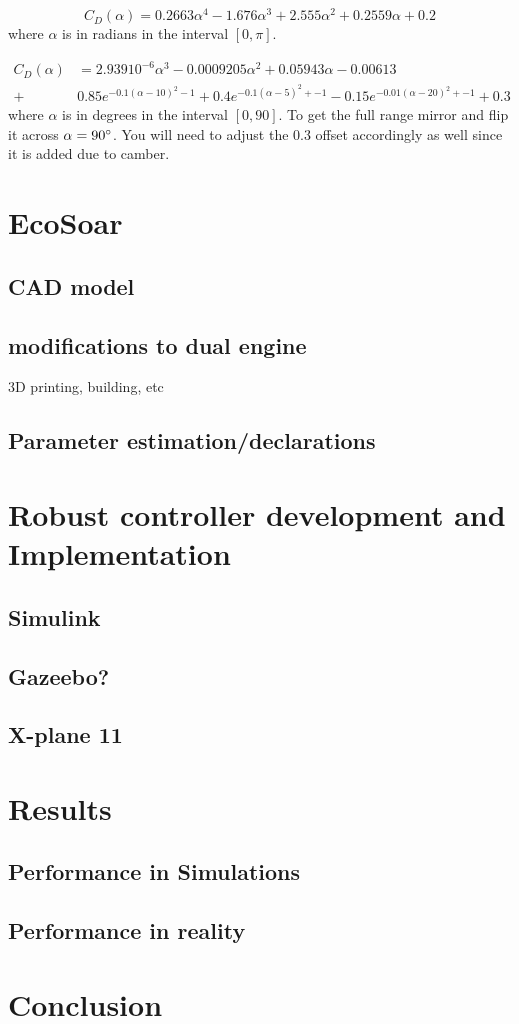 \documentclass{article}
\begin{document}
\begin{equation}
C_D(\alpha) = 0.2663 \alpha^4 -1.676 \alpha^3 + 2.555 \alpha^2 + 0.2559 \alpha + 0.2%
\end{equation}
where $\alpha$ is in radians in the interval $[0,\pi]$.

\begin{equation}\begin{split}
    C_D(\alpha) &= 2.939 10^{-6} \alpha^3 -0.0009205 \alpha^2 + 0.05943 \alpha -0.00613 \\
    +&
    0.85 e^{ -0.1 (\alpha - 10)^2 - 1 } + 0.4 e^{ -0.1 (\alpha - 5)^2 + -1 } - 0.15 e^{ -0.01 (\alpha - 20)^2 + -1 }
    + 0.3
\end{split}\end{equation}
where $\alpha$ is in degrees in the interval $[0,90]$.
To get the full range mirror and flip it across $\alpha = 90 \degree$.
You will need to adjust the $0.3$ offset accordingly as well since it is added due to camber.



\section{EcoSoar}
\subsection{CAD model}
\subsection{modifications to dual engine}
3D printing, building, etc
\subsection{Parameter estimation/declarations}

\section{\textbf{Robust controller development and Implementation}}
\subsection{Simulink}
\subsection{Gazeebo?}
\subsection{X-plane 11}


\section{Results}
\subsection{Performance in Simulations}
\subsection{Performance in reality}

\section{Conclusion}
\end{document}
